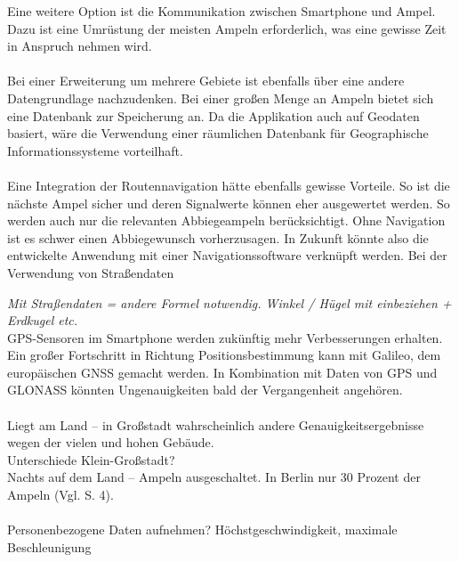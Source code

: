 Eine weitere Option ist die Kommunikation zwischen \gls{Smartphone} und Ampel. Dazu ist eine Umrüstung der meisten Ampeln erforderlich, was eine gewisse Zeit in Anspruch nehmen wird. \cite{smart_lsa}\\\\
Bei einer Erweiterung um mehrere Gebiete ist ebenfalls über eine andere Datengrundlage nachzudenken. Bei einer großen Menge an Ampeln bietet sich eine Datenbank zur Speicherung an. Da die Applikation auch auf Geodaten basiert, wäre die Verwendung einer räumlichen Datenbank für Geographische Informationssysteme vorteilhaft. \\\\
Eine Integration der Routennavigation hätte ebenfalls gewisse Vorteile. So ist die nächste Ampel sicher und deren Signalwerte können eher ausgewertet werden. So werden auch nur die relevanten Abbiegeampeln berücksichtigt. Ohne Navigation ist es schwer einen Abbiegewunsch vorherzusagen. In Zukunft könnte also die entwickelte Anwendung mit einer Navigationssoftware verknüpft werden. Bei der Verwendung von Straßendaten   


\textit{Mit Straßendaten = andere Formel notwendig. Winkel / Hügel mit einbeziehen + Erdkugel etc.}\\


\gls{GPS}-Sensoren im \gls{Smartphone} werden zukünftig mehr Verbesserungen erhalten. 
Ein großer Fortschritt in Richtung Positionsbestimmung kann mit Galileo, dem europäischen \gls{GNSS} gemacht werden. In Kombination mit Daten von \gls{GPS} und \gls{GLONASS} könnten Ungenauigkeiten bald der Vergangenheit angehören. \cite{gnss}\\\\


 Liegt am Land -- in Großstadt wahrscheinlich andere Genauigkeitsergebnisse wegen der vielen und hohen Gebäude.
\\
Unterschiede Klein-Großstadt? \\
Nachts auf dem Land -- Ampeln ausgeschaltet. In Berlin nur 30 Prozent der Ampeln (Vgl. \cite{lsa_bln} S. 4).\\\\

Personenbezogene Daten aufnehmen? Höchstgeschwindigkeit, maximale Beschleunigung
